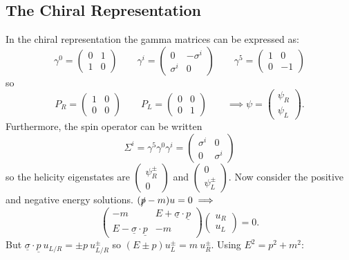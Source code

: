 \documentclass[a4paper,12pt]{article}
\newcommand{\icol}[1]{%
  \left(\begin{smallmatrix}#1\end{smallmatrix}\right)%
}
\begin{document}
\subsection{The Chiral Representation}
%
In the chiral representation the gamma matrices can be expressed as:
\[ \gamma^0 = \left( \begin{array}{cc}
0 & 1  \\
1 & 0  \end{array} \right) \qquad
\gamma^i = \left( \begin{array}{cc}
0 & -\sigma^i  \\
\sigma^i & 0  \end{array} \right) \qquad
\gamma^5 = \left( \begin{array}{cc}
1 & 0 \\
0 & -1     \end{array} \right)\] 
%
so
%
\[ P_R = \left( \begin{array}{cc}
1 & 0  \\
0 & 0  \end{array} \right) \qquad
P_L = \left( \begin{array}{cc}
0 & 0  \\
0 & 1  \end{array} \right) \qquad
\implies
\psi = \left( \begin{array}{c}
\psi_R  \\
\psi_L      \end{array} \right).\] 
%
Furthermore, the spin operator can be written
%
\[ \Sigma^i = \gamma^5\gamma^0\gamma^i = \left( \begin{array}{cc}
\sigma^i & 0  \\
0 & \sigma^i  \end{array} \right) \]
%
so the helicity eigenstates are $\icol{\psi_R^\pm\\0}$ and $\icol{0\\\psi_L^\pm}$. Now consider the positive and negative energy solutions. 
%
$(\slashed{p} - m)u =0 \implies$
%
\[ \left( \begin{array}{cc}
-m & E +\underline{\sigma}\cdot\underline{p}  \\
  E -\underline{\sigma}\cdot\underline{p}& -m  \end{array} \right)
\left( \begin{array}{c}
u_R   \\
u_L  \end{array} \right) = 0.\] 
%
But $\underline{\sigma}\cdot \underline{p}\ u_{L/R} = \pm p\ u_{L/R}^\pm$ so $(E \pm p)u_L^\pm = m\ u_R^\pm$. Using $E^2 = p^2 + m^2$:
\end{document}
